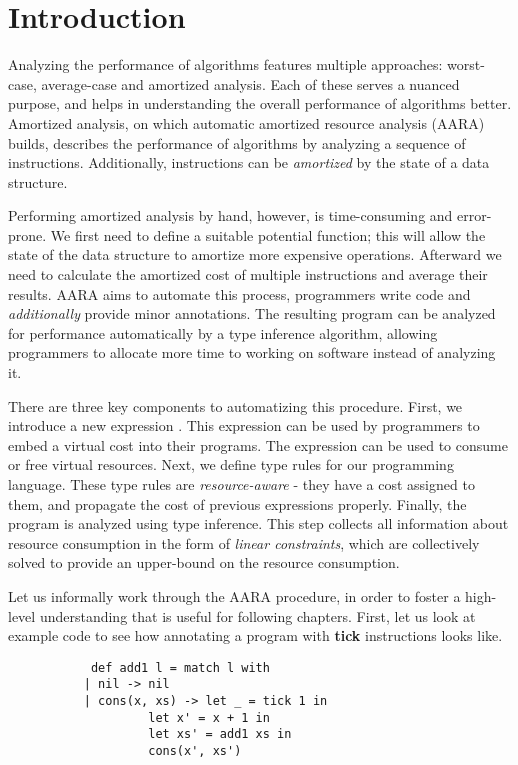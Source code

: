 \chapter{Introduction}\label{chap:introduction}

Analyzing the performance of algorithms features multiple approaches: worst-case, average-case and amortized analysis. Each of these serves a nuanced purpose, and helps in understanding the overall performance of algorithms better. Amortized analysis, on which automatic amortized resource analysis (AARA) builds, describes the performance of algorithms by analyzing a sequence of instructions. Additionally, instructions can be \emph{amortized} by the state of a data structure. 

Performing amortized analysis by hand, however, is time-consuming and error-prone. We first need to define a suitable potential function; this will allow the state of the data structure to amortize more expensive operations. Afterward we need to calculate the amortized cost of multiple instructions and average their results. AARA aims to automate this process, programmers write code and \emph{additionally} provide minor annotations. The resulting program can be analyzed for performance automatically by a type inference algorithm, allowing programmers to allocate more time to working on software instead of analyzing it. 

There are three key components to automatizing this procedure. First, we introduce a new expression . This expression can be used by programmers to embed a virtual cost into their programs. The \tick{} expression can be used to consume or free virtual resources. Next, we define type rules for our programming language. These type rules are \emph{resource-aware} - they have a cost assigned to them, and propagate the cost of previous expressions properly. Finally, the program is analyzed using type inference. This step collects all information about resource consumption in the form of \emph{linear constraints}, which are collectively solved to provide an upper-bound on the resource consumption.

Let us informally work through the AARA procedure, in order to foster a high-level understanding that is useful for following chapters. First, let us look at example code to see how annotating a program with \textbf{tick} instructions looks like. 

\begin{figure}[H] 
   \begin{verbatim}
      def add1 l = match l with 
	 | nil -> nil
	 | cons(x, xs) -> let _ = tick 1 in			  
			  let x' = x + 1 in
			  let xs' = add1 xs in
			  cons(x', xs')
   \end{verbatim}
\end{figure}

